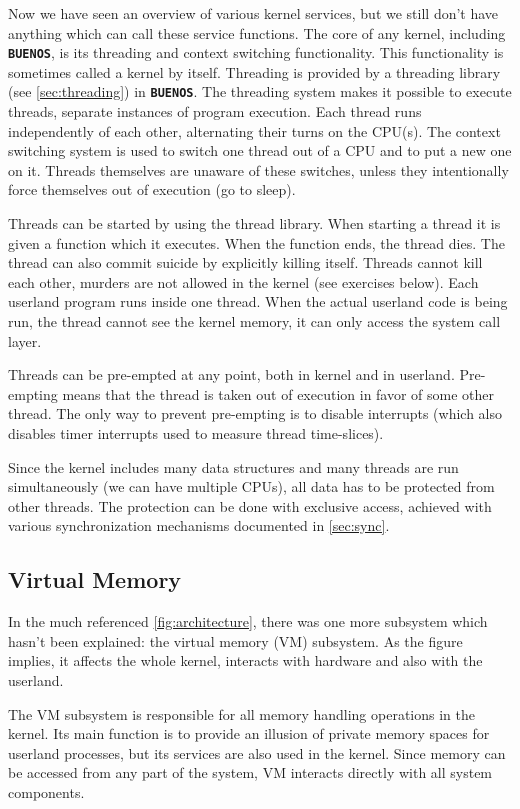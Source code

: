 \documentclass[twoside,a4paper]{report}
\newcommand{\buenos}{\texttt{\textbf{BUENOS}}}
\begin{document}
Now we have seen an overview of various kernel services, but we still
don't have anything which can call these service functions. The core
of any kernel, including \buenos{}, is its threading and context
switching functionality. This functionality is sometimes called a
kernel by itself. Threading is provided by a threading library (see
\autoref{sec:threading}) in \buenos{}. The threading system makes it
possible to execute threads, separate instances of program
execution. Each thread runs independently of each other, alternating
their turns on the CPU(s). The context switching system is used to
switch one thread out of a CPU and to put a new one on it. Threads
themselves are unaware of these switches, unless they intentionally
force themselves out of execution (go to sleep).

Threads can be started by using the thread library. When starting a
thread it is given a function which it executes. When the function
ends, the thread dies. The thread can also commit suicide by
explicitly killing itself. Threads cannot kill each other, murders are
not allowed in the kernel (see exercises below). Each userland program
runs inside one thread. When the actual userland code is being run,
the thread cannot see the kernel memory, it can only access the system
call layer.

Threads can be pre-empted at any point, both in kernel and in
userland. Pre-empting means that the thread is taken out of execution
in favor of some other thread. The only way to prevent pre-empting is
to disable interrupts (which also disables timer interrupts used to
measure thread time-slices).

Since the kernel includes many data structures and many threads are
run simultaneously (we can have multiple CPUs), all data has to be
protected from other threads. The protection can be done with
exclusive access, achieved with various synchronization mechanisms
documented in \autoref{sec:sync}.

\subsection{Virtual Memory}

In the much referenced \autoref{fig:architecture}, there was one
more subsystem which hasn't been explained: the virtual memory (VM)
subsystem. As the figure implies, it affects the whole kernel,
interacts with hardware and also with the userland.

The VM subsystem is responsible for all memory handling operations in
the kernel. Its main function is to provide an illusion of private
memory spaces for userland processes, but its services are also used
in the kernel. Since memory can be accessed from any part of the
system, VM interacts directly with all system components.
\end{document}
